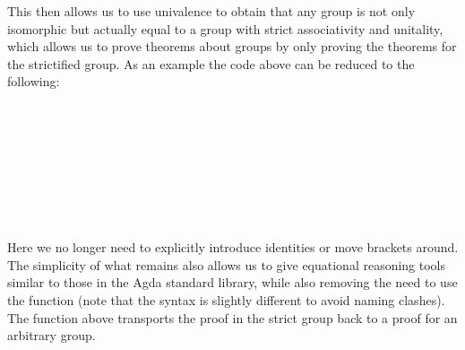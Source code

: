 \documentclass{article}
\begin{document}
This then allows us to use univalence to obtain that any group is not only isomorphic but actually equal to a group with strict associativity and unitality, which allows us to prove theorems about groups by only proving the theorems for the strictified group. As an example the code above can be reduced to the following:
\begin{code}%
\>[0]\AgdaSpace{}%
\AgdaSymbol{:}\AgdaSpace{}%
\AgdaSpace{}%
\AgdaSymbol{\{}\AgdaSymbol{\}}\AgdaSpace{}%
\AgdaSymbol{(}\AgdaSpace{}%
\AgdaSymbol{:}\AgdaSpace{}%
\AgdaSpace{}%
\AgdaSymbol{)}\AgdaSpace{}%
\AgdaSpace{}%
\AgdaSpace{}%
\<%
\\
\>[0]\AgdaSpace{}%
\AgdaSpace{}%
\AgdaSymbol{=}\AgdaSpace{}%
\AgdaSpace{}%
\<%
\\
\>[0][@{}l@{\AgdaIndent{0}}]%
\>[2]%
\>[117I]\AgdaSpace{}%
\AgdaSpace{}%
\AgdaSpace{}%
\AgdaSpace{}%
\<%
\\
\>[.][@{}l@{}]\<[117I]%
\>[4]\AgdaSpace{}%
%
\>[21]\AgdaSpace{}%
\AgdaSpace{}%
\AgdaSpace{}%
\<%
\\
%
\>[4]\AgdaSpace{}%
\AgdaSpace{}%
\AgdaSpace{}%
\AgdaSpace{}%
\AgdaSpace{}%
\AgdaSpace{}%
%
\>[21]%
\>[25]%
\>[32]\<%
\\
%
\>[4]\AgdaSpace{}%
\AgdaSpace{}%
\<%
\\
%
\>[2]\<%
\\
\>[2][@{}l@{\AgdaIndent{0}}]%
\>[4]\AgdaSpace{}%
\AgdaSpace{}%
\AgdaSpace{}%
\<%
\end{code}
Here we no longer need to explicitly introduce identities or move brackets around. The simplicity of what remains also allows us to give equational reasoning tools similar to those in the Agda standard library, while also removing the need to use the  function (note that the syntax is slightly different to avoid naming clashes). The function  above transports the proof in the strict group back to a proof for an arbitrary group.
\end{document}
